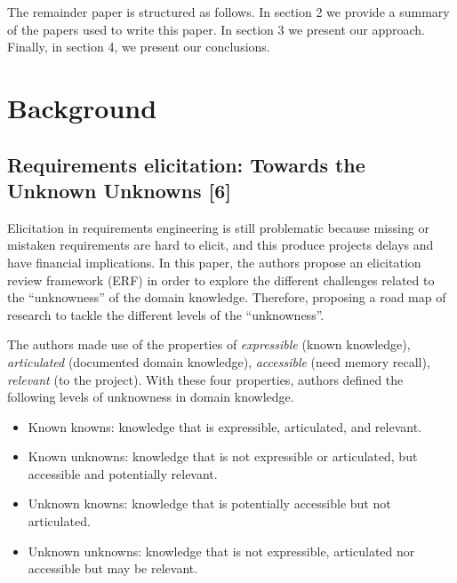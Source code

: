 \documentclass[]{llncs}
\begin{document}
The remainder paper is structured as follows. In section 2 we provide a
summary of the papers used to write this paper. In section 3 we present
our approach. Finally, in section 4, we present our conclusions.

\hypertarget{background}{%
\section{Background}\label{background}}

\hypertarget{requirements-elicitation-towards-the-unknown-unknowns-sutcliffe2013requirements}{%
\subsection{Requirements elicitation: Towards the Unknown Unknowns
{[}6{]}}\label{requirements-elicitation-towards-the-unknown-unknowns-sutcliffe2013requirements}}

Elicitation in requirements engineering is still problematic because
missing or mistaken requirements are hard to elicit, and this produce
projects delays and have financial implications. In this paper, the
authors propose an elicitation review framework (ERF) in order to
explore the different challenges related to the ``unknowness'' of the
domain knowledge. Therefore, proposing a road map of research to tackle
the different levels of the ``unknowness''.

The authors made use of the properties of \emph{expressible} (known
knowledge), \emph{articulated} (documented domain knowledge),
\emph{accessible} (need memory recall), \emph{relevant} (to the
project). With these four properties, authors defined the following
levels of unknowness in domain knowledge.

\begin{itemize}
\tightlist
\item
  Known knowns: knowledge that is expressible, articulated, and
  relevant.
\item
  Known unknowns: knowledge that is not expressible or articulated, but
  accessible and potentially relevant.
\item
  Unknown knowns: knowledge that is potentially accessible but not
  articulated.
\item
  Unknown unknowns: knowledge that is not expressible, articulated nor
  accessible but may be relevant.
\end{itemize}
\end{document}
